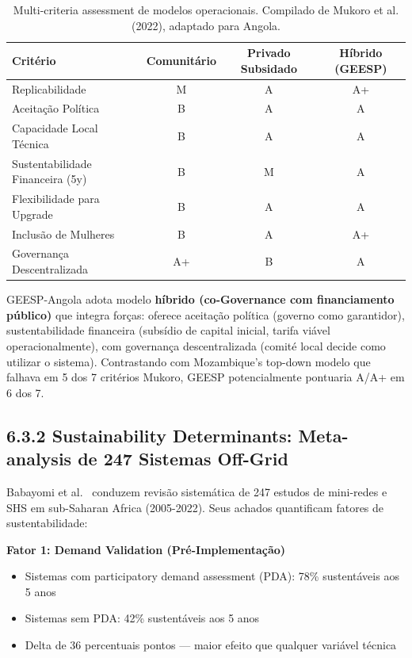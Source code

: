 \documentclass[12pt, a4paper]{article}
\begin{document}
\begin{table}[h]
\centering
\footnotesize
\begin{tabular}{|l|c|c|c|}
\hline
\textbf{Critério} & \textbf{Comunitário} & \textbf{Privado Subsidado} & \textbf{Híbrido (GEESP)} \\
\hline
Replicabilidade & M & A & A+ \\
Aceitação Política & B & A & A \\
Capacidade Local Técnica & B & A & A \\
Sustentabilidade Financeira (5y) & B & M & A \\
Flexibilidade para Upgrade & B & A & A \\
Inclusão de Mulheres & B & A & A+ \\
Governança Descentralizada & A+ & B & A \\
\hline
\end{tabular}
\caption{Multi-criteria assessment de modelos operacionais. Compilado de Mukoro et al. (2022), adaptado para Angola.}
\label{tab:business_models}
\end{table}

GEESP-Angola adota modelo \textbf{híbrido (co-Governance com financiamento público)} que integra forças: oferece aceitação política (governo como garantidor), sustentabilidade financeira (subsídio de capital inicial, tarifa viável operacionalmente), com governança descentralizada (comité local decide como utilizar o sistema). Contrastando com Mozambique's top-down modelo que falhava em 5 dos 7 critérios Mukoro, GEESP potencialmente pontuaria A/A+ em 6 dos 7.

\subsection*{6.3.2 Sustainability Determinants: Meta-analysis de 247 Sistemas Off-Grid}

Babayomi et al.~\citep{Babayomi2023} conduzem revisão sistemática de 247 estudos de mini-redes e SHS em sub-Saharan Africa (2005-2022). Seus achados quantificam fatores de sustentabilidade:

\textbf{Fator 1: Demand Validation (Pré-Implementação)}
\begin{itemize}
\item Sistemas com participatory demand assessment (PDA): 78\% sustentáveis aos 5 anos
\item Sistemas sem PDA: 42\% sustentáveis aos 5 anos
\item Delta de 36 percentuais pontos — maior efeito que qualquer variável técnica
\end{itemize}
\end{document}
